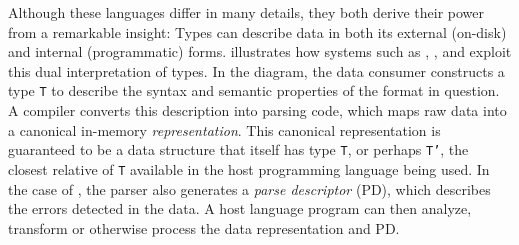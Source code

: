 


Although these languages differ in many details, 
they both derive their power from a remarkable insight: 
Types can describe data in both its external (on-disk) and internal
(programmatic) forms.
 illustrates how systems such as
\pads{}, \datascript{}, and \packettypes{} exploit this
dual interpretation of types.  In the diagram,
the data consumer constructs a type {\tt T}
to describe the syntax and semantic properties of the format 
in question.  A compiler converts this
description into parsing code, which maps raw data into a canonical
in-memory {\em representation}.  
This canonical representation is guaranteed to be a data structure
that itself has type {\tt T}, or perhaps {\tt T'}, the closest relative of
{\tt T} available in the host programming language
being used.
In the case of \pads{}, the parser also generates a {\em parse 
descriptor} (PD), which
describes the errors detected in the data.  
A host language program can then analyze, transform or
otherwise process the data representation and PD. 

